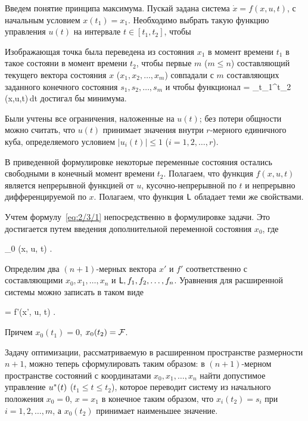 Введем понятие принципа максимума. Пускай задана система $\dot{x} = f(x, u, t)$, с начальным условием $x(t_1) = x_1$. Необходимо выбрать такую функцию управления $u(t)$ на интервале $t \in [t_1, t_2]$, чтобы

\benum
	\item
		Изображающая точка была переведена из состояния $x_1$ в момент времени $t_1$ в такое состояни в момент времени $t_2$, чтобы первые $m$ ($m \leqslant n$) составляющий текущего вектора состояния $x$ ($x_1, x_2, \ldots, x_m$) совпадали с $m$ составляющих заданного конечного состояния $s_1, s_2, \ldots, s_m$ и чтобы функционал
			\funcF = \int\limits_{t_1}^{t_2} \funcL(x,u,t)\,dt
		\eeq
		достигал бы минимума.
		
	\item
		Были учтены все ограничения, наложенные на $u(t)$; без потери общности можно считать, что $u(t)$ принимает значения внутри $r$-мерного единичного куба, определяемого условием $|u_i(t)| \leqslant 1$ ($i = 1,2,\ldots,r$).
\eenum

В приведенной формулировке некоторые переменные состояния остались свободными в конечный момент времени $t_2$. Полагаем, что функция $f(x, u, t)$ является непрерывной функцией от $u$, кусочно-непрерывной по $t$ и непрерывно дифференцируемой по $x$. Полагаем, что функция $\mathsf{L}$ обладает теми же свойствами.

Учтем формулу~\ref{eq:2/3/1} непосредственно в формулировке задачи. Это достигается путем введения дополнительной переменной состояния $x_0$, где

    _0 \equiv \funcL(x, u, t) \mbox{.}
\eeq

Определим два $(n+1)$-мерных вектора $x'$ и $f'$ соответственно с составляющими $x_0, x_1, \ldots, x_n$ и $\mathsf{L}, f_1, f_2, \ldots, f_n$. Уравнения для расширенной системы можно записать в таком виде

     = f'(x', u, t) \mbox{.}
\eeq

Причем $x_0(t_1) = 0$, $x_0(t_2) = \mathcal{F}$.

Задачу оптимизации, рассматриваемую в расширенном пространстве размерности $n+1$, можно теперь сформулировать таким образом: в $(n+1)$-мерном пространстве состояний с координатами $x_0, x_1, \ldots, x_n$ найти допустимое управление $u^{*}(t)$ ($t_1 \leqslant t \leqslant t_2$), которое переводит систему из начального положения $x_0 = 0$, $x = x_1$ в конечное таким образом, что $x_i(t_2) = s_i$ при $i = 1, 2, \ldots, m$, а $x_0(t_2)$ принимает наименьшее значение.


